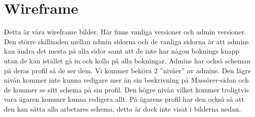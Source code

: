 \documentclass[11pt, titlepage, oneside, a4paper]{article}	%
\begin{document}
\section{Wireframe}
Detta är våra wireframe bilder. Här finns vanliga versioner och admin versioner. Den större skillnaden mellan admin sidorna och de vanliga sidorna är att admins kan ändra det mesta på alla sidor samt att de inte har någon boknings knapp utan de kan istället gå in och kolla på alla bokningar. Admins har också scheman på deras profil så de ser dem. Vi kommer behöva 2 ”nivåer” av admins. Den lägre nivån kommer inte kunna redigare mer än sin beskrivning på Massörer-sidan och de kommer se sitt schema på sin profil. Den högre nivån vilket kommer troligtvis vara ägaren kommer kunna redigera allt. På ägarens profil har den också så att den kan sätta alla arbetares schema, detta är dock inte visat i bilderna nedan.
\newpage
\end{document}
